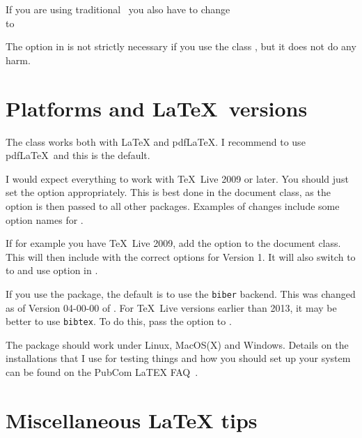 If you are using traditional \BibTeX\ you also have to change\\
\verb|| to\\
\verb||

The  option in  is not strictly necessary if you use the class ,
but it does not do any harm.


\section{Platforms and \LaTeX\ versions}
\label{sec:version}

The  class works both with \LaTeX{} and pdf\LaTeX{}.
I recommend to use pdf\LaTeX\ and this is the default.

I would expect everything to work with \TeX\ Live 2009 or later.
You should just set the option  appropriately.
This is best done in the document class, as the option is then passed to all other packages.
Examples of changes include some option names for .

If for example you have \TeX\ Live 2009, add the option  to the document class.
This will then include  with the correct options for Version 1.
It will also switch to  to 
and use option  in .

If you use the  package,
the default is to use the \texttt{biber} backend.
This was changed as of Version 04-00-00 of .
For \TeX\ Live versions earlier than 2013, it may be better to use \texttt{bibtex}.
To do this, pass the option  to .

The  package should work under Linux, MacOS(X) and Windows.
Details on the installations that I use for testing things
and how you should set up your system can be found on the PubCom LaTEX FAQ~\cite{latex-faq}.


\section{Miscellaneous \LaTeX{} tips}
\label{sec:latex}

